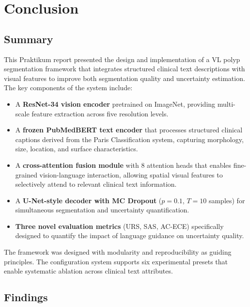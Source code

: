 
\chapter{Conclusion}
\label{ch:conclusion}

\section{Summary}
\label{sec:concl:summary}

This Praktikum report presented the design and implementation of a \ac{VL} polyp segmentation framework that integrates structured clinical text descriptions with visual features to improve both segmentation quality and uncertainty estimation. The key components of the system include:

\begin{itemize}
	\item A \textbf{\ac{ResNet}-34 vision encoder} pretrained on ImageNet, providing multi-scale feature extraction across five resolution levels.
	
	\item A \textbf{frozen \ac{PubMedBERT} text encoder} that processes structured clinical captions derived from the Paris Classification system, capturing morphology, size, location, and surface characteristics.
	
	\item A \textbf{cross-attention fusion module} with 8 attention heads that enables fine-grained vision-language interaction, allowing spatial visual features to selectively attend to relevant clinical text information.
	
	\item A \textbf{U-Net-style decoder with \ac{MC} Dropout} ($p = 0.1$, $T = 10$ samples) for simultaneous segmentation and uncertainty quantification.
	
	\item \textbf{Three novel evaluation metrics} (\ac{URS}, \ac{SAS}, \ac{AC-ECE}) specifically designed to quantify the impact of language guidance on uncertainty quality.
\end{itemize}

The framework was designed with modularity and reproducibility as guiding principles. The configuration system supports six experimental presets that enable systematic ablation across clinical text attributes.


\section{Findings}
\label{sec:concl:findings}

